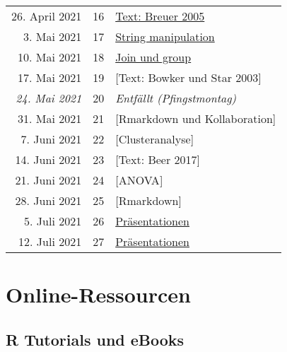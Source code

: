 \documentclass[
  ngerman,
]{article}
\begin{document}
\begin{longtable}[]{@{}rrl@{}}
26. April 2021 & 16 & \protect\hyperlink{text-breuer-2005}{Text: Breuer 2005} \\
3. Mai 2021 & 17 & \protect\hyperlink{string-manipulation}{String manipulation} \\
10. Mai 2021 & 18 & \protect\hyperlink{join-und-group}{Join und group} \\
17. Mai 2021 & 19 & {[}Text: Bowker und Star 2003{]} \\
\emph{24. Mai 2021} & 20 & \emph{Entfällt (Pfingstmontag)} \\
31. Mai 2021 & 21 & {[}Rmarkdown und Kollaboration{]} \\
7. Juni 2021 & 22 & {[}Clusteranalyse{]} \\
14. Juni 2021 & 23 & {[}Text: Beer 2017{]} \\
21. Juni 2021 & 24 & {[}ANOVA{]} \\
28. Juni 2021 & 25 & {[}Rmarkdown{]} \\
5. Juli 2021 & 26 & \protect\hyperlink{pruxe4sentationen}{Präsentationen} \\
12. Juli 2021 & 27 & \protect\hyperlink{pruxe4sentationen}{Präsentationen} \\
\bottomrule
\end{longtable}

\hypertarget{online-ressourcen}{%
\section*{Online-Ressourcen}\label{online-ressourcen}}

\hypertarget{r-tutorials-und-ebooks}{%
\subsection*{R Tutorials und eBooks}\label{r-tutorials-und-ebooks}}
\end{document}
